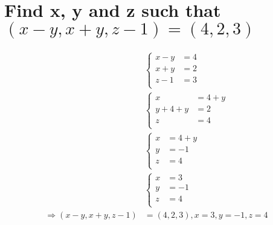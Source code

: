 \documentclass{article}
\begin{document}
\section{Find x, y and z such that $(x - y, x + y, z - 1) = (4, 2, 3)$}
\begin{equation}
    \begin{split}
        & \begin{cases}
            x - y & = 4 \\
            x + y & = 2 \\
            z - 1 & = 3 \\
        \end{cases} \\
        & \begin{cases}
            x & = 4 + y     \\
            y + 4 + y & = 2 \\
            z & = 4         \\
        \end{cases} \\
        & \begin{cases}
            x & = 4 + y \\
            y & = -1    \\
            z & = 4     \\
        \end{cases} \\
        & \begin{cases}
            x & = 3     \\
            y & = -1    \\
            z & = 4     \\
        \end{cases} \\
        \Longrightarrow (x - y, x + y, z - 1) & = (4, 2, 3), x = 3, y = -1, z = 4
    \end{split}
\end{equation}
\end{document}

